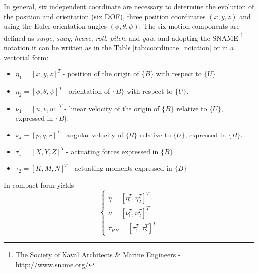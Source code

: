 \par In general, six independent coordinate are necessary to determine the evolution of the position and orientation (six \ac{DOF}), three position coordinates $(x,y,z)$ and using the Euler orientation angles $(\phi, \theta, \psi)$. The six motion components are defined as \textit{surge}, \textit{sway}, \textit{heave}, \textit{roll}, \textit{pitch}, and \textit{yaw}, and adopting the SNAME \footnote{The Society of Naval Architects \& Marine Engineers - http://www.sname.org/} notation it can be written as in the Table \ref{tab:coordinate_notation} or in a vectorial form: 
\begin{itemize}
    \item $\eta_1 = [x,y,z]^T$ - position of the origin of $\{B\}$ with respect to $\{U\}$
    \item $\eta_2 = [\phi, \theta, \psi]^T$ - orientation of $\{B\}$ with respect to $\{U\}$.
    \item $\nu_1 = [u,v,w]^T$ - linear velocity of the origin of $\{B\}$ relative to $\{U\}$, expressed in $\{B\}$.
    \item $\nu_2 = [p,q,r]^T$ - angular velocity of $\{B\}$ relative to $\{U\}$, expressed in $\{B\}$.
    \item $\tau_1 = [X,Y,Z]^T$ - actuating forces expressed in $\{B\}$.
    \item $\tau_2 = [K,M,N]^T$ - actuating moments expressed in $\{B\}$
\end{itemize}
In compact form yields
\begin{equation}
    \begin{cases}
        \eta = [\eta_1^T, \eta_2^T]^T \\
        \nu = [\nu_1^T, \nu_2^T]^T \\
        \tau_{RB} = [\tau_1^T, \tau_2^T]^T
    \end{cases}
\end{equation}


